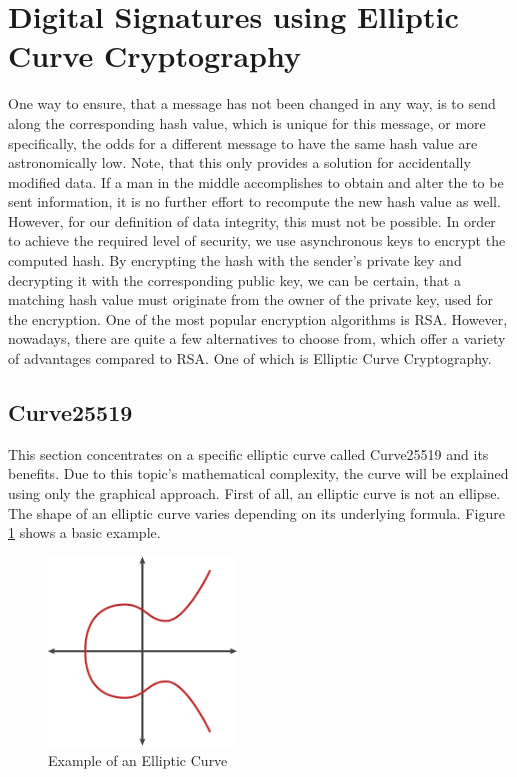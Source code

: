 \section{Digital Signatures using Elliptic Curve Cryptography}

One way to ensure, that a message has not been changed in any way, is to send along the corresponding hash value, which is unique for this message, or more specifically, the odds for a different message to have the same hash value are astronomically low. Note, that this only provides a solution for accidentally modified data. If a man in the middle accomplishes to obtain and alter the to be sent information, it is no further effort to recompute the new hash value as well. However, for our definition of data integrity, this must not be possible. In order to achieve the required level of security, we use asynchronous keys to encrypt the computed hash. By encrypting the hash with the sender's private key and decrypting it with the corresponding public key, we can be certain, that a matching hash value must originate from the owner of the private key, used for the encryption. 
One of the most popular encryption algorithms is RSA. However, nowadays, there are quite a few alternatives to choose from, which offer a variety of advantages compared to RSA. One of which is Elliptic Curve Cryptography. 

\subsection{Curve25519}
This section concentrates on a specific elliptic curve called Curve25519 and its benefits.
Due to this topic's mathematical complexity, the curve will be explained using only the graphical approach.
First of all, an elliptic curve is not an ellipse. The shape of an elliptic curve varies depending on its underlying formula. Figure \ref{ec1} shows a basic example.
\begin{figure}
\centering
\includegraphics[width=5cm]{Pages/EC/ec.png}
\caption{Example of an Elliptic Curve}
\label{ec1}
\end{figure}

